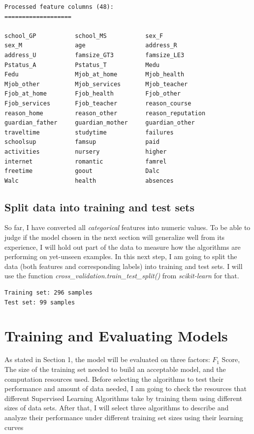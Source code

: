\documentclass[a4paper]{article}
\begin{document}
\begin{lstlisting}
Processed feature columns (48):
===================

school_GP         	school_MS         	sex_F             
sex_M             	age               	address_R         
address_U         	famsize_GT3       	famsize_LE3       
Pstatus_A         	Pstatus_T         	Medu              
Fedu              	Mjob_at_home      	Mjob_health       
Mjob_other        	Mjob_services     	Mjob_teacher      
Fjob_at_home      	Fjob_health       	Fjob_other        
Fjob_services     	Fjob_teacher      	reason_course     
reason_home       	reason_other      	reason_reputation 
guardian_father   	guardian_mother   	guardian_other    
traveltime        	studytime         	failures          
schoolsup         	famsup            	paid              
activities        	nursery           	higher            
internet          	romantic          	famrel            
freetime          	goout             	Dalc              
Walc              	health            	absences  
\end{lstlisting}

\subsection{Split data into training and test sets}
So far, I have converted all \textit{categorical} features into numeric values. To be able to judge if the model chosen in the next section will generalize well from its experience, I will hold out part of the data to measure how the algorithms are performing on yet-unseen examples. In this next step, I am going to split the data (both features and corresponding labels) into training and test sets. I will use the function \textit{cross\_validation.train\_test\_split()} from \textit{scikit-learn} for that.

\begin{lstlisting}
Training set: 296 samples
Test set: 99 samples
\end{lstlisting}


\section{Training and Evaluating Models}
As stated in Section 1, the model will be evaluated on three factors: $F_1$ Score, The size of the training set needed to build an acceptable model, and the computation resources used. Before selecting the algorithms to test their performance and amount of data needed, I am going to check the resources that different Supervised Learning Algorithms take by training them using different sizes of data sets.  After that, I will select three algorithms to describe and analyze their performance under different training set sizes using their learning curves
\end{document}
